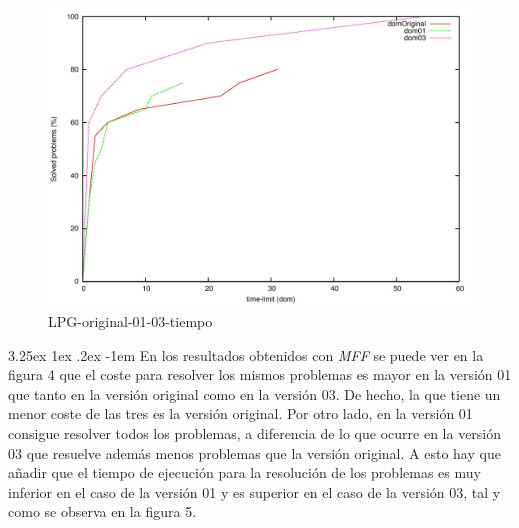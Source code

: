 \documentclass{article}
\makeatletter
\renewcommand\paragraph{\@startsection{paragraph}{5}{\z@}%
      {3.25ex \@plus1ex \@minus.2ex}%
      {-1em}%
      {\normalfont\normalsize\bfseries}}
\makeatother
\begin{document}
    \begin{figure}[H]
        \centering
        \includegraphics[width=12cm, height=8cm]{lpg-or-01-03-time}
        \caption{LPG-original-01-03-tiempo}
    \end{figure}
    
    \paragraph{}
    En los resultados obtenidos con \textit{MFF} se puede ver en la figura 4 que el coste para resolver los mismos problemas es mayor en la versión 01 que tanto en la versión original como en la versión 03. De hecho, la que tiene un menor coste de las tres es la versión original. Por otro lado, en la versión 01 consigue resolver todos los problemas, a diferencia de lo que ocurre en la versión 03 que resuelve además menos problemas que la versión original. A esto hay que añadir que el tiempo de ejecución para la resolución de los problemas es muy inferior en el caso de la versión 01 y es superior en el caso de la versión 03, tal y como se observa en la figura 5.
    
\end{document}
